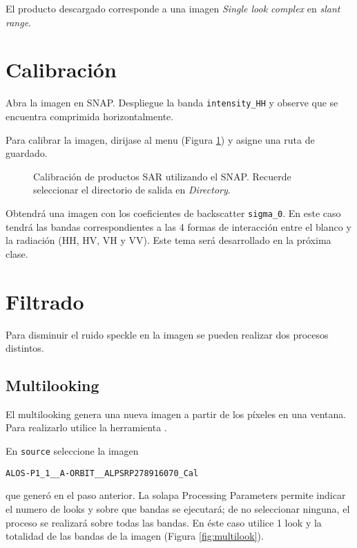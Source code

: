 El producto descargado corresponde a una imagen \emph{Single look complex} en \emph{slant range}.

\section{Calibración}

Abra la imagen  en SNAP. Despliegue la banda \texttt{intensity\_HH} y observe que se encuentra comprimida horizontalmente.

Para calibrar la imagen, dirijase al menu  (Figura \ref{fig:calibrar}) y asigne una ruta de guardado.

 \begin{figure}[h!]
     \centering
     \hspace{1cm}
     \caption{Calibración de productos SAR utilizando el SNAP. Recuerde seleccionar el directorio de salida en \emph{Directory}.} %
     \label{fig:calibrar}
 \end{figure}

 Obtendrá una imagen con los coeficientes de backscatter \texttt{sigma\_0}. En este caso tendrá las bandas correspondientes a las 4 formas de interacción entre el blanco y la radiación (HH, HV, VH y VV). Este tema será desarrollado en la próxima clase.

 \section{Filtrado}

 Para disminuir el ruido speckle en la imagen se pueden realizar dos procesos distintos.

 \subsection{Multilooking}

 El multilooking genera una nueva imagen a partir de los píxeles en una ventana. Para realizarlo utilice la herramienta .

 En \texttt{source} seleccione la imagen
 \begin{center} \texttt{ALOS-P1\_1\_\_A-ORBIT\_\_ALPSRP278916070\_Cal} \end{center}
 que generó en el paso anterior. La solapa Processing Parameters permite indicar el numero de looks y sobre que bandas se ejecutará; de no seleccionar ninguna, el proceso se realizará sobre todas las bandas. En éste caso utilice 1 look y la totalidad de las bandas de la imagen (Figura \ref{fig:multilook}).

